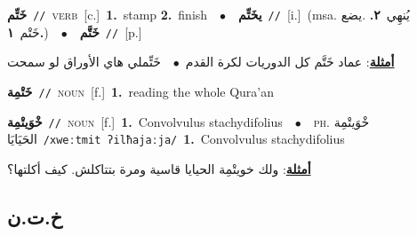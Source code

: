 \documentclass[10pt,a4paper,twoside]{article} %
\begin{document}
\begin{multicols}{2}
{{{\setlength\topsep{0pt}\textbf{\foreignlanguage{arabic}{خَتِّم}}\ {\color{gray}\texttt{//}\color{black}}\ \textsc{verb}\ [c.]\ \textbf{1.}~stamp  \textbf{2.}~finish\ \ $\bullet$\ \ \setlength\topsep{0pt}\textbf{\foreignlanguage{arabic}{يخَتِّم}}\ {\color{gray}\texttt{//}\color{black}}\ [i.]\ \color{gray}(msa. \foreignlanguage{arabic}{يُنهِي}~\foreignlanguage{arabic}{\textbf{٢.}}  .\foreignlanguage{arabic}{يضع خَتْم}~\foreignlanguage{arabic}{\textbf{١.}})\color{black}\ \ $\bullet$\ \ \setlength\topsep{0pt}\textbf{\foreignlanguage{arabic}{خَتَّم}}\ {\color{gray}\texttt{//}\color{black}}\ [p.]\  \begin{flushright}\color{gray}\foreignlanguage{arabic}{\textbf{\underline{\foreignlanguage{arabic}{أمثلة}}}: عماد خَتَّم كل الدوريات لكرة القدم\ $\bullet$\ \  خَتِّملي هاي الأوراق لو سمحت}\end{flushright}\color{black}} \vspace{2mm}

{\setlength\topsep{0pt}\textbf{\foreignlanguage{arabic}{خَتْمِة}}\ {\color{gray}\texttt{//}\color{black}}\ \textsc{noun}\ [f.]\ \textbf{1.}~reading the whole Qura'an\ 

{\setlength\topsep{0pt}\textbf{\foreignlanguage{arabic}{خْوَيتْمِة}}\ {\color{gray}\texttt{//}\color{black}}\ \textsc{noun}\ [f.]\ \textbf{1.}~Convolvulus stachydifolius\ \ $\bullet$\ \ \textsc{ph.} \color{gray} \foreignlanguage{arabic}{خْوَيتْمِة الحَيَايَا}\color{black}\ {\color{gray}\texttt{/{\sffamily xweːtmit ʔilħajaːja}/}\color{black}}\ \textbf{1.}~Convolvulus stachydifolius\  \begin{flushright}\color{gray}\foreignlanguage{arabic}{\textbf{\underline{\foreignlanguage{arabic}{أمثلة}}}: ولك خويتْمِة الحيايا قاسية ومرة بتتاكلش. كيف أكلتها؟}\end{flushright}\color{black}} \vspace{2mm}

\vspace{-3mm}
\subsection*{\color{blue}\foreignlanguage{arabic}{خ.ت.ن}\color{blue}{}} 

}}}
\end{multicols}
\end{document}
